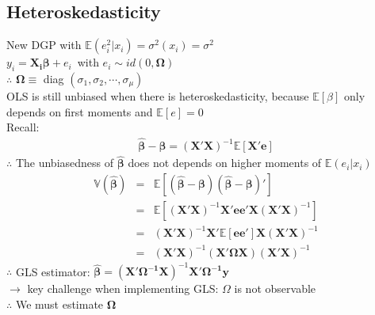 \subsection{Heteroskedasticity}
New DGP with $\mathbb{E}(e_{i}^{2}|x_{i})=\sigma^{2}(x_{i})=\sigma^{2}$\\
$y_{i}=\boldsymbol{X_{i}\beta}+e_{i}$\ with $e_{i}\sim id(0,\boldsymbol{\Omega})$\\
$\therefore$ $\boldsymbol{\Omega}\equiv$ diag $(\sigma_{1},\sigma_{2},\cdots,\sigma_{\mu})$\\
OLS is still unbiased when there is heteroskedasticity, because $\mathbb{E}[\beta]$ only depends on first moments and $\mathbb{E}[e]=0$\\
Recall:
\begin{eqnarray*}
\boldsymbol{\hat{\beta}}-\boldsymbol{\beta}=(\boldsymbol{X'X})^{-1}\mathbb{E}[\boldsymbol{X'e}]
\end{eqnarray*}
$\therefore$ The unbiasedness of $\boldsymbol{\hat{\beta}}$ does not depends on higher moments of $\mathbb{E}(e_{i}|x_{i})$
\begin{eqnarray*}
\mathbb{V}(\boldsymbol{\hat{\beta}}) &=& \mathbb{E}[(\boldsymbol{\hat{\beta}}-\boldsymbol{\beta})(\boldsymbol{\hat{\beta}}-\boldsymbol{\beta})']\\
&=& \mathbb{E}[(\boldsymbol{X'X})^{-1}\boldsymbol{X'ee'X}(\boldsymbol{X'X})^{-1}]\\
&=& (\boldsymbol{X'X})^{-1}\boldsymbol{X'}\mathbb{E}[\boldsymbol{ee'}]\boldsymbol{X}(\boldsymbol{X'X})^{-1}\\
&=& (\boldsymbol{X'X})^{-1}(\boldsymbol{X'\Omega X})(\boldsymbol{X'X})^{-1}
\end{eqnarray*}
$\therefore$ GLS estimator: $\boldsymbol{\hat{\beta}}=(\boldsymbol{X'\Omega^{-1}X})^{-1}\boldsymbol{X'\Omega^{-1}y}$\\
$\to$ key challenge when implementing GLS: $\Omega$ is not observable\\
$\therefore$ We must estimate $\boldsymbol{\Omega}$

